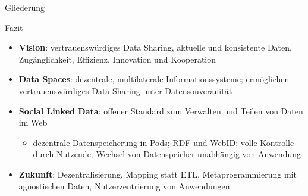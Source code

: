




\maketitle



\begin{frame}{Gliederung}
    \tableofcontents
\end{frame}











\begin{frame}{Fazit}
    \begin{itemize}
        \item \textbf{Vision}: vertrauenswürdiges Data Sharing, aktuelle und konsistente Daten, Zugänglichkeit, Effizienz, Innovation und Kooperation
        \item \textbf{Data Spaces}: dezentrale, multilaterale Informationssysteme; ermöglichen vertrauenswürdiges Data Sharing unter Datensouveränität
        \item \textbf{Social Linked Data}: offener Standard zum Verwalten und Teilen von Daten im Web
        \begin{itemize}
            \item dezentrale Datenspeicherung in Pods; RDF und WebID; volle Kontrolle durch Nutzende; Wechsel von Datenspeicher unabhängig von Anwendung
        \end{itemize}
        \item \textbf{Zukunft}: Dezentralisierung, Mapping statt ETL, Metaprogrammierung mit agnostischen Daten, Nutzerzentrierung von Anwendungen
    \end{itemize}
\end{frame}


